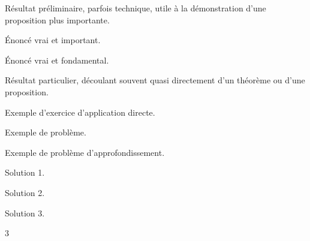 \begin{lemme*}
	Résultat préliminaire, parfois technique, utile à la démonstration d'une proposition plus importante.
\end{lemme*}

\begin{proposition*}
	Énoncé vrai et important.
\end{proposition*}

\begin{theorem*}
	Énoncé vrai et fondamental.
\end{theorem*}

\begin{corollaire*}
	Résultat particulier, découlant souvent quasi directement d'un théorème ou d'une proposition.
\end{corollaire*}

\begin{Exercise}[label=1]%
	Exemple d'exercice d'application directe.
\end{Exercise}
\begin{Exercise}[difficulty=1, label=2]%
	Exemple de problème.
\end{Exercise}
\begin{Exercise}[difficulty=2, label=3]%
	Exemple de problème d'approfondissement.
\end{Exercise}
\shipoutExercise
\begin{Answer}[ref=1]
	Solution 1.
\end{Answer}
\begin{Answer}[ref=2]
	Solution 2.
\end{Answer}
\begin{Answer}[ref=3]
	Solution 3.
\end{Answer}
\begin{multicols}{3}
\shipoutAnswer
\end{multicols}
